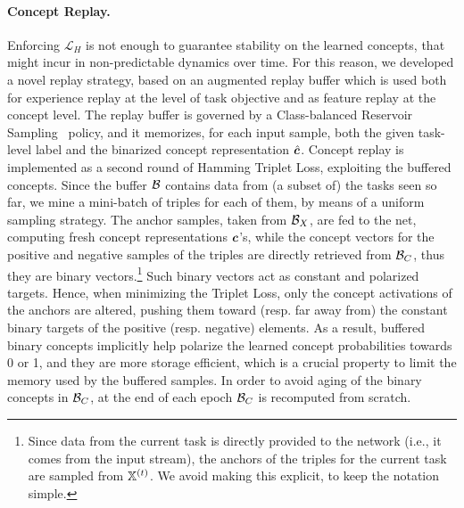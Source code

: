 \paragraph{Concept Replay.} Enforcing $\mathcal{L}_H$ is not enough to guarantee stability on the learned concepts, that might incur in non-predictable dynamics over time. For this reason, we developed a novel replay strategy, based on an augmented replay buffer which is used both for experience replay at the level of task objective and as feature replay at the concept level. The replay buffer is governed by a Class-balanced Reservoir Sampling~\cite{chrysakis2020online} policy, and it memorizes, for each input sample, both the given task-level label and the binarized concept representation $\hat{{\bm{c}}}$.
%
Concept replay is implemented as a second round of Hamming Triplet Loss, exploiting the buffered concepts. Since the buffer ${\mathcal{B}}$ contains data from (a subset of) the tasks seen so far, we mine a mini-batch of triples for each of them, by means of a uniform sampling strategy. %
The anchor samples, taken from ${\mathcal{B}}_X$, are fed to the net, computing fresh concept representations ${\bm{c}}$'s, while the concept vectors for the positive and negative samples of the triples are directly retrieved from ${\mathcal{B}}_{C}$, thus they are binary vectors.\footnote{Since data from the current task is directly provided to the network (i.e., it comes from the input stream), the anchors of the triples for the current task are sampled from ${\mathbb{X}}^{(t)}$. We avoid making this explicit, to keep the notation simple.} Such binary vectors act as constant and polarized targets. Hence, when minimizing the Triplet Loss, only the concept activations of the anchors are altered, pushing them toward (resp. far away from) the constant binary targets of the positive (resp. negative) elements. As a result, buffered binary concepts implicitly help polarize the learned concept probabilities towards 0 or 1, and they are more storage efficient, which is a crucial property to limit the memory used by the buffered samples. In order to avoid aging of the binary concepts in ${\mathcal{B}}_{C}$, at the end of each epoch ${\mathcal{B}}_{C}$ is recomputed from scratch.

